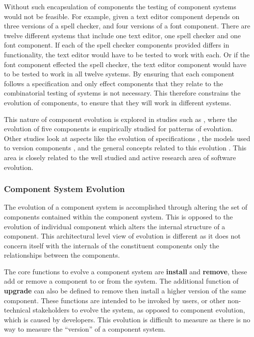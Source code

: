 Without such encapsulation of components the testing of component systems would not be feasible.
For example, given a text editor component depends on three versions of a spell checker, 
and four versions of a font component.
There are twelve different systems that include one text editor, one spell checker and one font component.
If each of the spell checker components provided differs in functionality, the text editor would have to be tested to work with each.
Or if the font component effected the spell checker, the text editor component would have to be tested to work in all twelve systems.
By ensuring that each component follows a specification and only effect components that they relate to the combinatorial testing of systems is not necessary.
This therefore constrains the evolution of components, to ensure that they will work in different systems.

This nature of component evolution is explored in studies such as \citep{vasa2007patterns}, 
where the evolution of five components is empirically studied for patterns of evolution.
Other studies look at aspects like the evolution of specifications \citep{Mencl2001}, the models used to version components \citep{Stuckenholz2005},
and the general concepts related to this evolution \citep{Rhode2000}.
This area is closely related to the well studied and active research area of software evolution.

\subsubsection{Component System Evolution}
The evolution of a component system is accomplished through altering the set of components contained within the component system.
This is opposed to the evolution of individual component which alters the internal structure of a component.
This architectural level view of evolution is different as it does not concern itself with the internals of the constituent components only the relationships between the components.

The core functions to evolve a component system are \textbf{install} and \textbf{remove}, these add or remove a component to or from the system.
The additional function of \textbf{upgrade} can also be defined to remove then install a higher version of the same component. 
These functions are intended to be invoked by users, or other non-technical stakeholders to evolve the system,
as opposed to component evolution, which is caused by developers.
This evolution is difficult to measure as there is no way to measure the ``version'' of a component system.
 
